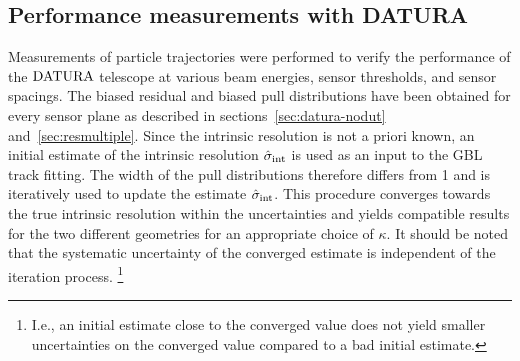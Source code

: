 \subsection{Performance measurements with DATURA}
\label{sec:measurements}

Measurements of particle trajectories were performed to verify the performance of the $\textrm{DATURA}$ telescope at various beam energies, sensor thresholds, and sensor spacings. %
The biased residual and biased pull distributions have been obtained for every sensor plane as described in sections~\ref{sec:datura-nodut} and~\ref{sec:resmultiple}. 
% 
Since the intrinsic resolution is not a priori known, an initial estimate of the intrinsic resolution $\hat{\sigma}_{\textrm{int}}$ is used as an input to the GBL track fitting. 
The width of the pull distributions therefore differs from 1 and is iteratively used to update the estimate $\hat{\sigma}_{\textrm{int}}$.
This procedure converges towards the true intrinsic resolution within the uncertainties and yields compatible results for the two different geometries for an appropriate choice of $\kappa$. 
It should be noted that the systematic uncertainty of the converged estimate is independent of the iteration process.
\footnote{I.e., an initial estimate close to the converged value does not yield smaller uncertainties on the converged value compared to a bad initial estimate.}


